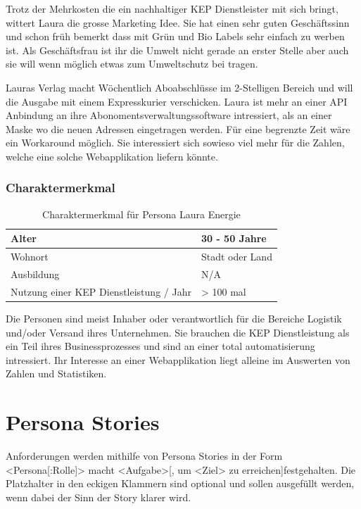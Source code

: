 Trotz der Mehrkosten die ein nachhaltiger KEP Dienstleister mit sich bringt, wittert Laura die grosse Marketing Idee. Sie hat einen sehr guten Geschäftssinn und schon früh bemerkt dass mit Grün und Bio Labels sehr einfach zu werben ist. Als Geschäftsfrau ist ihr die Umwelt nicht gerade an erster Stelle aber auch sie will wenn möglich etwas zum Umweltschutz bei tragen.


Lauras Verlag macht Wöchentlich Aboabschlüsse im 2-Stelligen Bereich und will die Ausgabe mit einem Expresskurier verschicken. Laura ist mehr an einer API Anbindung an ihre Abonomentsverwaltungssoftware intressiert, als an einer Maske wo die neuen Adressen eingetragen werden. Für eine begrenzte Zeit wäre ein Workaround möglich. Sie interessiert sich sowieso viel mehr für die Zahlen, welche eine solche Webapplikation liefern könnte.

\subsubsection{Charaktermerkmal}
\begin{table}[]
\centering

\label{my-label}
\begin{tabular}{|l|l|}
\hline
Alter                                   & 30 - 50 Jahre        \\ \hline
Wohnort                                 & Stadt oder Land         \\ \hline
Ausbildung                              & N/A  \\ \hline
Nutzung einer KEP Dienstleistung / Jahr & > 100 mal            \\ \hline
\end{tabular}
\caption{Charaktermerkmal für Persona Laura Energie}
\end{table}

Die Personen sind meist Inhaber oder verantwortlich für die Bereiche Logistik und/oder Versand ihres Unternehmen. Sie brauchen die KEP Dienstleistung als ein Teil ihres Businessprozesses und sind an einer total automatisierung intressiert. Ihr Interesse an einer Webapplikation liegt alleine im Auswerten von Zahlen und Statistiken.



\section{Persona Stories}

 Anforderungen werden mithilfe von Persona Stories in der Form \glqq <Persona[:Rolle]> macht <Aufgabe>[, um <Ziel> zu erreichen]\grqq festgehalten. Die Platzhalter in den eckigen Klammern sind optional und sollen ausgefüllt werden, wenn dabei der Sinn der Story klarer wird.


